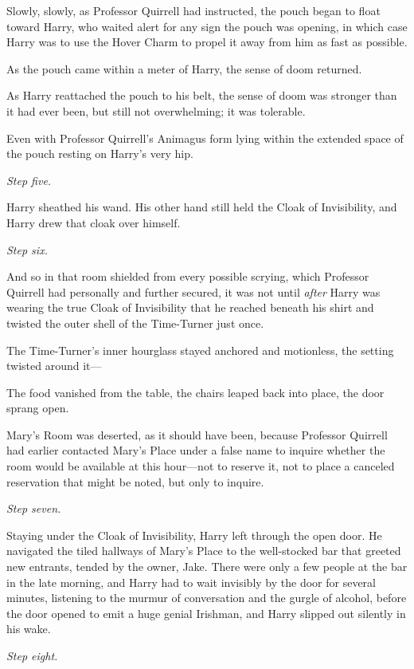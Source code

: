 Slowly, slowly, as Professor Quirrell had instructed, the pouch began to float
toward Harry, who waited alert for any sign the pouch was opening, in which
case Harry was to use the Hover Charm to propel it away from him as fast as
possible.

As the pouch came within a meter of Harry, the sense of doom returned.

As Harry reattached the pouch to his belt, the sense of doom was stronger than
it had ever been, but still not overwhelming; it was tolerable.

Even with Professor Quirrell's Animagus form lying within the extended space of
the pouch resting on Harry's very hip.

\emph{Step five.}

Harry sheathed his wand. His other hand still held the Cloak of Invisibility,
and Harry drew that cloak over himself.

\emph{Step six.}

And so in that room shielded from every possible scrying, which Professor
Quirrell had personally and further secured, it was not until \emph{after}
Harry was wearing the true Cloak of Invisibility that he reached beneath his
shirt and twisted the outer shell of the Time-Turner just once.

The Time-Turner's inner hourglass stayed anchored and motionless, the setting
twisted around it---

The food vanished from the table, the chairs leaped back into place, the door
sprang open.

Mary's Room was deserted, as it should have been, because Professor Quirrell
had earlier contacted Mary's Place under a false name to inquire whether the
room would be available at this hour---not to reserve it, not to place a
canceled reservation that might be noted, but only to inquire.

\emph{Step seven.}

Staying under the Cloak of Invisibility, Harry left through the open door. He
navigated the tiled hallways of Mary's Place to the well-stocked bar that
greeted new entrants, tended by the owner, Jake. There were only a few people
at the bar in the late morning, and Harry had to wait
invisibly by the door for several minutes, listening to the murmur of
conversation and the gurgle of alcohol, before the door opened to emit a huge
genial Irishman, and Harry slipped out silently in his wake.

\emph{Step eight.}

